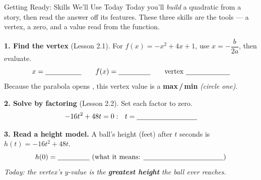 \documentclass[10pt]{article}
\begin{document}

\vspace{0.10in}

\begin{notesbox}{Getting Ready: Skills We'll Use Today}
\small Today you'll \emph{build} a quadratic from a story, then read the answer off its features. These three skills
are the tools --- a vertex, a zero, and a value read from the function.

\vspace{4pt}
\textbf{1. Find the vertex} (Lesson 2.1). For $f(x)=-x^2+4x+1$, use $x=-\dfrac{b}{2a}$, then evaluate.
\[
  x=\blank{1.8cm} \qquad f(x)=\blank{1.6cm} \qquad \text{vertex } \blank{2.2cm}
\]
Because the parabola opens \underline{\hspace{2.2cm}}, this vertex value is a \textbf{max\,/\,min} \emph{(circle one)}.

\vspace{4pt}
\textbf{2. Solve by factoring} (Lesson 2.2). Set each factor to zero.
\[
  -16t^2+48t=0:\ \ t=\blank{3.0cm}
\]

\vspace{4pt}
\textbf{3. Read a height model.} A ball's height (feet) after $t$ seconds is $h(t)=-16t^2+48t$.
\[
  h(0)=\blank{1.6cm}\ \text{(what it means: \blank{4.0cm})}
\]
\emph{Today: the vertex's $y$-value is the \textbf{greatest height} the ball ever reaches.}
\end{notesbox}
\end{document}
